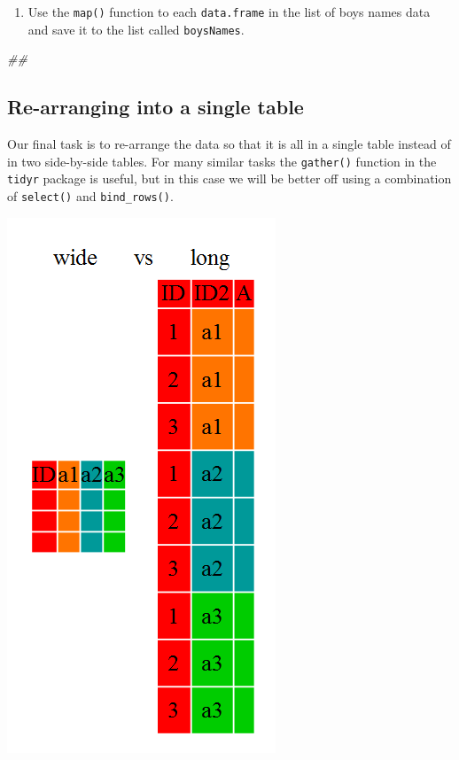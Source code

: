 \documentclass[]{book}
\newenvironment{Shaded}{\begin{snugshade}}{\end{snugshade}}
\newcommand{\CommentTok}[1]{\textcolor[rgb]{0.56,0.35,0.01}{\textit{#1}}}
\providecommand{\tightlist}{%
  \setlength{\itemsep}{0pt}\setlength{\parskip}{0pt}}
\begin{document}
\begin{enumerate}
\def\labelenumi{\arabic{enumi}.}
\setcounter{enumi}{2}
\tightlist
\item
  Use the \texttt{map()} function to each \texttt{data.frame} in the list of boys
  names data and save it to the list called \texttt{boysNames}.
\end{enumerate}

\begin{Shaded}
\begin{Highlighting}[]
\CommentTok{## }
\end{Highlighting}
\end{Shaded}

\hypertarget{re-arranging-into-a-single-table}{%
\subsection{Re-arranging into a single table}\label{re-arranging-into-a-single-table}}

Our final task is to re-arrange the data so that it is all in a single
table instead of in two side-by-side tables. For many similar tasks
the \texttt{gather()} function in the \texttt{tidyr} package is useful, but in this
case we will be better off using a combination of \texttt{select()} and
\texttt{bind\_rows()}.

\includegraphics{R/RDataWrangling/images/wide_vs_long.png}
\end{document}
